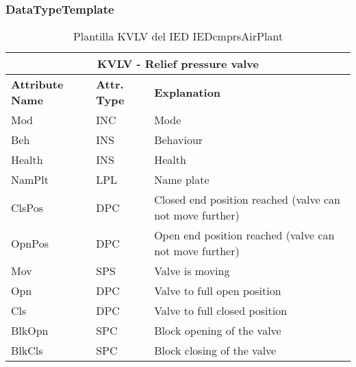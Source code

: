     \subsubsection{DataTypeTemplate}
    \begin{table}[H]
    \begin{center}
    \begin{tabular}{|l|l|p{8.5cm}|}
            \hline
            \multicolumn{3}{|c|}{\cellcolor[gray]{0.8} \textbf{ KVLV}  - Relief pressure valve} \\
            \hline
            \textbf{Attribute Name} & \textbf{Attr. Type} & \textbf{Explanation} \\
            \hline 
            Mod & INC & Mode \\
            \hline
            Beh & INS & Behaviour \\
            \hline
            Health & INS & Health \\
            \hline
            NamPlt & LPL & Name plate \\
            \hline
            ClsPos & DPC & Closed end position reached (valve can not move further) \\
            \hline
            OpnPos & DPC & Open end position reached (valve can not move further) \\
            \hline
            Mov & SPS & Valve is moving \\
            \hline
            Opn & DPC & Valve to full open position \\
            \hline
            Cls & DPC & Valve to full closed position \\
            \hline
            BlkOpn & SPC & Block opening of the valve \\
            \hline
            BlkCls & SPC & Block closing of the valve \\
            \hline
    \end{tabular}
    \caption{Plantilla KVLV del IED IEDcmprsAirPlant}
    \label{table:lnTypeKVLV_relief}
    \end{center}
    \end{table}
    
    
    